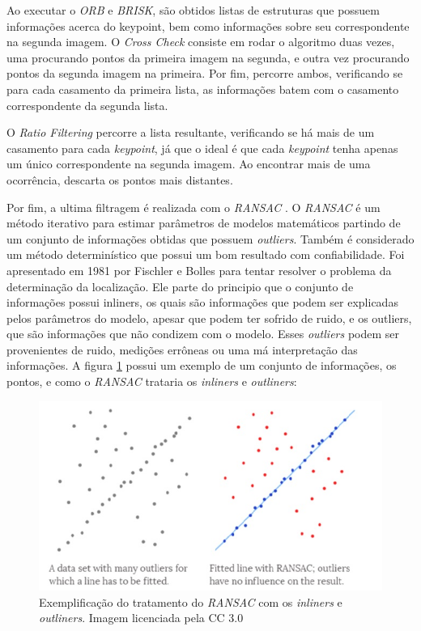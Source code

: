 Ao executar o \textit{ORB} e \textit{BRISK}, são obtidos listas de estruturas que possuem informações acerca do keypoint, bem como informações sobre seu correspondente na segunda imagem. O \textit{Cross Check} consiste em rodar o algoritmo duas vezes, uma procurando pontos da primeira imagem na segunda, e outra vez procurando pontos da segunda imagem na primeira. Por fim, percorre ambos, verificando se para cada casamento da primeira lista, as informações batem com o casamento correspondente da segunda lista.

O \textit{Ratio Filtering} percorre a lista resultante, verificando se há mais de um casamento para cada \textit{keypoint}, já que o ideal é que cada \textit{keypoint} tenha apenas um único correspondente na segunda imagem. Ao encontrar mais de uma ocorrência, descarta os pontos mais distantes.

Por fim, a ultima filtragem é realizada com o \textit{RANSAC} \cite{RANSAC}. O \textit{RANSAC} é um método iterativo para estimar parâmetros de modelos matemáticos partindo de um conjunto de informações obtidas que possuem \textit{outliers}. Também é considerado um método determinístico que possui um bom resultado com confiabilidade. Foi apresentado em 1981 por Fischler e Bolles para tentar resolver o problema da determinação da localização. Ele parte do principio que o conjunto de informações possui inliners, os quais são informações que podem ser explicadas pelos parâmetros do modelo, apesar que podem ter sofrido de ruido, e os outliers, que são informações que não condizem com o modelo. Esses \textit{outliers} podem ser provenientes de ruido, medições errôneas ou uma má interpretação das informações. A figura \ref{fig3:1} possui um exemplo de um conjunto de informações, os pontos, e como o \textit{RANSAC} trataria os \textit{inliners} e \textit{outliners}:

\begin{figure}
	\centering
		\includegraphics{Imagens/figura3-1.jpg}
	\caption{Exemplificação do tratamento do \textit{RANSAC} com os \textit{inliners} e \textit{outliners}. Imagem licenciada pela CC 3.0}
	\label{fig3:1}
\end{figure}
  


